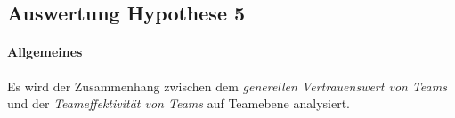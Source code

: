 \documentclass[a4paper,11pt]{article}%
\renewcommand{\\}{\vspace*{0.5\baselineskip} \newline}
\begin{document}
{\newpage
\subsection{Auswertung Hypothese 5}
\label{Auswertung Hypothese 5}
\paragraph{Allgemeines}
Es wird der Zusammenhang zwischen dem \textit{generellen Vertrauenswert von Teams} und der \textit{Teameffektivität von Teams} auf Teamebene analysiert.
 
}
\end{document}
